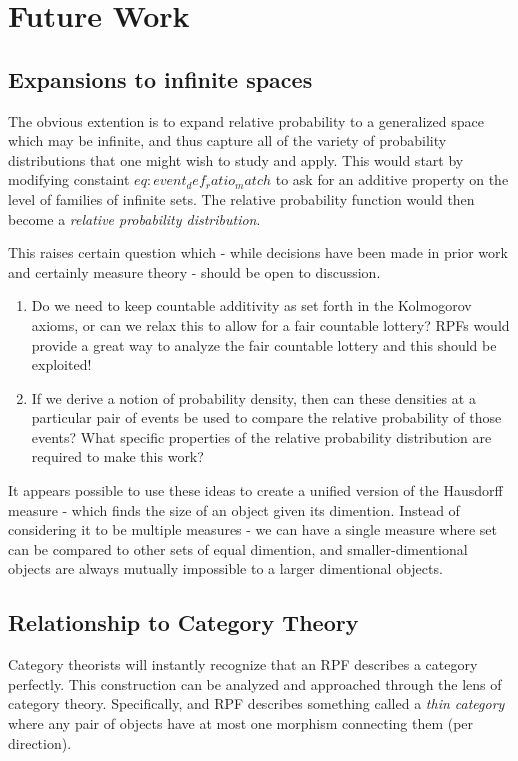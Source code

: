 \documentclass[twoside]{article}
\theoremstyle{plain}%
\theoremstyle{definition}
\theoremstyle{remark}
\begin{document}
\section{Future Work}
\subsection{Expansions to infinite spaces}
The obvious extention is to expand relative probability to a generalized space which may be infinite, and thus capture all of the variety of probability distributions that one might wish to study and apply. This would start by modifying constaint \(eq:event_def_ratio_match\) to ask for an additive property on the level of families of infinite sets. The relative probability function would then become a \textit{relative probability distribution}.

This raises certain question which - while decisions have been made in prior work and certainly measure theory - should be open to discussion.
\begin{enumerate}
\item Do we need to keep countable additivity as set forth in the Kolmogorov axioms, or can we relax this to allow for a fair countable lottery? RPFs would provide a great way to analyze the fair countable lottery and this should be exploited!
\item If we derive a notion of probability density, then can these densities at a particular pair of events be used to compare the relative probability of those events? What specific properties of the relative probability distribution are required to make this work?
\end{enumerate}

It appears possible to use these ideas to create a unified version of the Hausdorff measure - which finds the size of an object given its dimention. Instead of considering it to be multiple measures - we can have a single measure where set can be compared to other sets of equal dimention, and smaller-dimentional objects are always mutually impossible to a larger dimentional objects.

\subsection{Relationship to Category Theory}

Category theorists will instantly recognize that an RPF describes a category perfectly. This construction can be analyzed and approached through the lens of category theory. Specifically, and RPF describes something called a \textit{thin category} where any pair of objects have at most one morphism connecting them (per direction).
\end{document}
